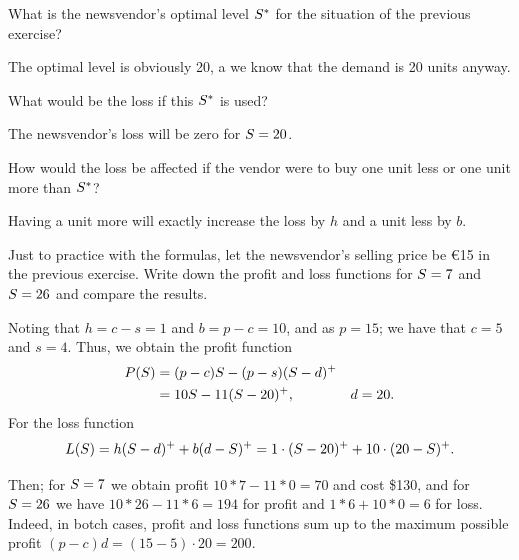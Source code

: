 \begin{exercise}
What is the newsvendor's optimal level $S^*$ for the situation of the previous exercise? 
\begin{solution}
The optimal level is obviously 20, a we know that the demand is 20 units anyway. 
\end{solution}
\end{exercise}

\begin{exercise}
What would be the loss if this $S^*$ is used? 
\begin{solution}
The newsvendor's loss will be zero for $S=20$. 
\end{solution}
\end{exercise}

\begin{exercise}
How would the loss be affected if the vendor were to buy one unit less or one unit more than $S^*$?
\begin{solution}
Having a unit more will exactly increase the loss by $h$ and a unit less by $b$. 
\end{solution}
\end{exercise}

\begin{exercise} Just to practice with the formulas, 
let the newsvendor's selling price be €15 in the previous exercise. Write down the profit and loss functions for $S=7$ and $S=26$ and compare the results.
\begin{solution}
Noting that $h=c-s=1$ and $b=p-c=10$, and as $p=15$; we have that $c=5$ and $s=4$. Thus, we obtain the profit function
\begin{align*}
P(S) 
&= (p-c)S - (p-s)(S-d)^+ \\
&= 10 S - 11 (S-20)^+, & d=20.
\end{align*}
For the loss function
\begin{align*}
L(S) = h(S-d)^+ + b(d-S)^+ = 1\cdot (S-20)^+ + 10\cdot(20-S)^+.
\end{align*}

Then; for $S=7$ we obtain profit $10*7 - 11*0 =70$ and cost \$130, and for $S=26$ we have $10*26-11*6 = 194$ for profit and $1*6 + 10*0 = 6$ for loss. Indeed, in botch cases, profit and loss functions sum up to the maximum possible profit $(p-c)d=(15-5)\cdot 20=200$.
\end{solution}
\end{exercise}

